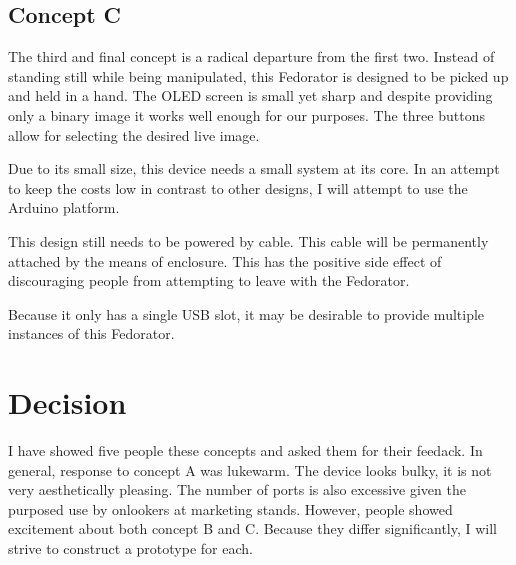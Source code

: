         \subsection{Concept C}
            The third and final concept is a radical departure from the first two.  Instead of standing still while being manipulated, this Fedorator is designed to be picked up and held in a hand.  The OLED screen is small yet sharp and despite providing only a binary image it works well enough for our purposes.  The three buttons allow for selecting the desired live image.
            
            Due to its small size, this device needs a small system at its core.  In an attempt to keep the costs low in contrast to other designs, I will attempt to use the Arduino platform.
            
            This design still needs to be powered by cable.  This cable will be permanently attached by the means of enclosure.  This has the positive side effect of discouraging people from attempting to leave with the Fedorator.
            
            Because it only has a single USB slot, it may be desirable to provide multiple instances of this Fedorator.
            \newpage
            
    \section{Decision}
        I have showed five people these concepts and asked them for their feedack.  In general, response to concept A was lukewarm.  The device looks bulky, it is not very aesthetically pleasing.  The number of ports is also excessive given the purposed use by onlookers at marketing stands.  However, people showed excitement about both concept B and C.  Because they differ significantly, I will strive to construct a prototype for each.

